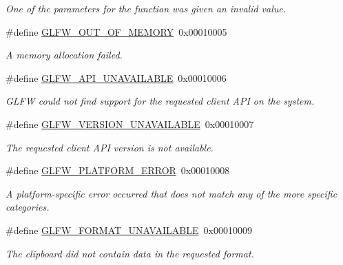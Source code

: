 \begin{DoxyCompactItemize}
\begin{DoxyCompactList}\small\item\em \-One of the parameters for the function was given an invalid value. \end{DoxyCompactList}\item 
\hypertarget{group__errors_ga9023953a2bcb98c2906afd071d21ee7f}{\#define \hyperlink{group__errors_ga9023953a2bcb98c2906afd071d21ee7f}{\-G\-L\-F\-W\-\_\-\-O\-U\-T\-\_\-\-O\-F\-\_\-\-M\-E\-M\-O\-R\-Y}~0x00010005}\label{group__errors_ga9023953a2bcb98c2906afd071d21ee7f}

\begin{DoxyCompactList}\small\item\em \-A memory allocation failed. \end{DoxyCompactList}\item 
\hypertarget{group__errors_ga56882b290db23261cc6c053c40c2d08e}{\#define \hyperlink{group__errors_ga56882b290db23261cc6c053c40c2d08e}{\-G\-L\-F\-W\-\_\-\-A\-P\-I\-\_\-\-U\-N\-A\-V\-A\-I\-L\-A\-B\-L\-E}~0x00010006}\label{group__errors_ga56882b290db23261cc6c053c40c2d08e}

\begin{DoxyCompactList}\small\item\em \-G\-L\-F\-W could not find support for the requested client \-A\-P\-I on the system. \end{DoxyCompactList}\item 
\hypertarget{group__errors_gad16c5565b4a69f9c2a9ac2c0dbc89462}{\#define \hyperlink{group__errors_gad16c5565b4a69f9c2a9ac2c0dbc89462}{\-G\-L\-F\-W\-\_\-\-V\-E\-R\-S\-I\-O\-N\-\_\-\-U\-N\-A\-V\-A\-I\-L\-A\-B\-L\-E}~0x00010007}\label{group__errors_gad16c5565b4a69f9c2a9ac2c0dbc89462}

\begin{DoxyCompactList}\small\item\em \-The requested client \-A\-P\-I version is not available. \end{DoxyCompactList}\item 
\hypertarget{group__errors_gad44162d78100ea5e87cdd38426b8c7a1}{\#define \hyperlink{group__errors_gad44162d78100ea5e87cdd38426b8c7a1}{\-G\-L\-F\-W\-\_\-\-P\-L\-A\-T\-F\-O\-R\-M\-\_\-\-E\-R\-R\-O\-R}~0x00010008}\label{group__errors_gad44162d78100ea5e87cdd38426b8c7a1}

\begin{DoxyCompactList}\small\item\em \-A platform-\/specific error occurred that does not match any of the more specific categories. \end{DoxyCompactList}\item 
\hypertarget{group__errors_ga196e125ef261d94184e2b55c05762f14}{\#define \hyperlink{group__errors_ga196e125ef261d94184e2b55c05762f14}{\-G\-L\-F\-W\-\_\-\-F\-O\-R\-M\-A\-T\-\_\-\-U\-N\-A\-V\-A\-I\-L\-A\-B\-L\-E}~0x00010009}\label{group__errors_ga196e125ef261d94184e2b55c05762f14}

\begin{DoxyCompactList}\small\item\em \-The clipboard did not contain data in the requested format. \end{DoxyCompactList}\end{DoxyCompactItemize}
